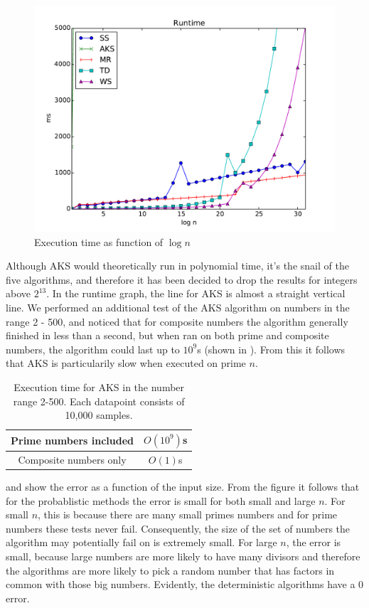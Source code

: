 \begin{figure}
    \centering
    \includegraphics[width=\columnwidth]{results/runtime.pdf}
    \caption{Execution time as function of $\log n$}
    \label{fig:runtime}
\end{figure}

Although AKS would theoretically run in polynomial time,
it's the snail of the five algorithms,
and therefore it has been decided to drop the results for integers above $2^{13}$.
In the runtime graph, the line for AKS is almost a straight vertical line.
We performed an additional test of the AKS algorithm on numbers in the range 2 - 500, and noticed that for composite numbers
the algorithm generally finished in less than a second, but when ran on both prime and composite numbers, the algorithm could last up to $10^9$s (shown in ).
From this it follows that AKS is particularily slow when executed on prime $n$.

\begin{table}
\centering
\caption{Execution time for AKS in the number range 2-500. Each datapoint consists of 10,000 samples.}
\begin{tabular}{|c|c|} \hline
Prime numbers included & $O(10^9)$s\\ \hline
Composite numbers only & $O(1)$s\\ \hline
\end{tabular}
\label{tab:pressure}
\end{table}

 and  show the error as a function of the input size.
From the figure it follows that for the probablistic methods the error is small for both small and large $n$.
For small $n$, this is because there are many small primes numbers and for prime numbers these tests never fail. %
Consequently, the size of the set of numbers the algorithm may potentially fail on is extremely small.
For large $n$, the error is small, because large numbers are more likely to have many divisors and therefore the algorithms are more likely to pick a random number that has factors in common with those big numbers.
Evidently, the deterministic algorithms have a 0 error.

